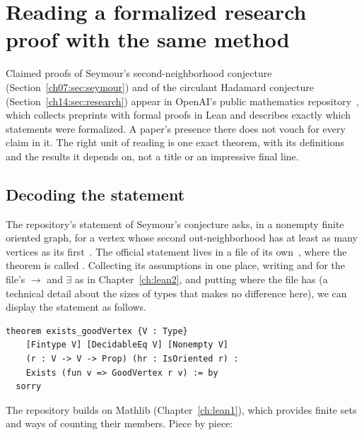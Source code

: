 \section{Reading a formalized research proof with the same method}\label{ch17:sec:research}
Claimed proofs of Seymour's second-neighborhood conjecture (Section~\ref{ch07:sec:seymour}) and of the circulant Hadamard conjecture (Section~\ref{ch14:sec:research}) appear in OpenAI's public mathematics repository~\cite{oairepo}, which collects preprints with formal proofs in Lean and describes exactly which statements were formalized. A paper's presence there does not vouch for every claim in it. The right unit of reading is one exact theorem, with its definitions and the results it depends on, not a title or an impressive final line.

\subsection*{Decoding the statement}
The repository's statement of Seymour's conjecture asks, in a nonempty finite oriented graph, for a vertex whose second out-neighborhood has at least as many vertices as its first~\cite{oai173}. The official statement lives in a file of its own~\cite{oaistatement}, where the theorem is called . Collecting its assumptions in one place, writing \code{->} and  for the file's $\to$ and $\exists$ as in Chapter~\ref{ch:lean2}, and putting  where the file has  (a technical detail about the sizes of types that makes no difference here), we can display the statement as follows.
\par\noindent\begin{minipage}{\linewidth}
\begin{lstlisting}
theorem exists_goodVertex {V : Type}
    [Fintype V] [DecidableEq V] [Nonempty V]
    (r : V -> V -> Prop) (hr : IsOriented r) :
    Exists (fun v => GoodVertex r v) := by
  sorry
\end{lstlisting}
\end{minipage}\par
The repository builds on Mathlib (Chapter~\ref{ch:lean1}), which provides finite sets and ways of counting their members. Piece by piece:
